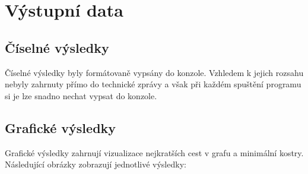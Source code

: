 \section{Výstupní data}

\subsection{Číselné výsledky}
Číselné výsledky byly formátovaně vypsány do konzole. Vzhledem k jejich rozsahu nebyly zahrnuty přímo do technické zprávy a však při každém spuštění programu si je lze snadno nechat vypsat do konzole.

\subsection{Grafické výsledky}
Grafické výsledky zahrnují vizualizace nejkratších cest v grafu a minimální kostry. Následující obrázky zobrazují jednotlivé výsledky:

